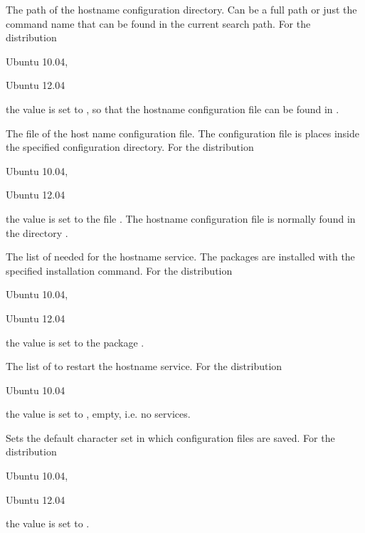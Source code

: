 The path of the hostname configuration directory. Can be a full path or
just the command name that can be found in the current search path.
For the distribution
\begin{inparaitem}
\item[\TheDistribution{ubuntu}] Ubuntu 10.04,
\item[\TheDistribution{ubuntu}] Ubuntu 12.04
\end{inparaitem}
the value is set to , so that the hostname configuration
file can be found in .


The file  of the host name configuration file. The configuration file
is places inside the specified configuration directory.
For the distribution
\begin{inparaitem}
\item[\TheDistribution{ubuntu}] Ubuntu 10.04,
\item[\TheDistribution{ubuntu}] Ubuntu 12.04
\end{inparaitem}
the value is set to the file . The hostname configuration
file is normally found in the directory .


The list of  needed for the hostname service. The packages
are installed with the specified installation command.
For the distribution
\begin{inparaitem}
\item[\TheDistribution{ubuntu}] Ubuntu 10.04,
\item[\TheDistribution{ubuntu}] Ubuntu 12.04
\end{inparaitem}
the value is set to the package .


The list of  to restart the hostname service.
For the distribution
\begin{inparaitem}
\item[\TheDistribution{ubuntu}] Ubuntu 10.04
\end{inparaitem}
the value is set to \qcode{}, empty, i.e. no services.


Sets the default character set  in which configuration files are 
saved. For the distribution
\begin{inparaitem}
\item[\TheDistribution{ubuntu}] Ubuntu 10.04,
\item[\TheDistribution{ubuntu}] Ubuntu 12.04
\end{inparaitem}
the value is set to .

